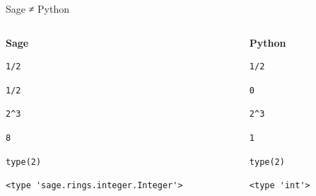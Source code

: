 \documentclass[presentation,smaller]{beamer}
\begin{document}
\begin{frame}[fragile,label={sec:orgae0d8c3}]{Sage ≠ Python}
 \begin{columns}[t]
\begin{column}{0.45\columnwidth}
\textbf{Sage}

\lstset{language=sage,label= ,caption= ,captionpos=b,numbers=none}
\begin{lstlisting}
1/2
\end{lstlisting}

\begin{verbatim}
1/2
\end{verbatim}

\lstset{language=sage,label= ,caption= ,captionpos=b,numbers=none}
\begin{lstlisting}
2^3
\end{lstlisting}

\begin{verbatim}
8
\end{verbatim}

\lstset{language=sage,label= ,caption= ,captionpos=b,numbers=none}
\begin{lstlisting}
type(2)
\end{lstlisting}

\begin{verbatim}
<type 'sage.rings.integer.Integer'>
\end{verbatim}
\end{column}

\begin{column}{0.45\columnwidth}
\textbf{Python}

\lstset{language=Python,label= ,caption= ,captionpos=b,numbers=none}
\begin{lstlisting}
1/2
\end{lstlisting}

\begin{verbatim}
0
\end{verbatim}

\lstset{language=Python,label= ,caption= ,captionpos=b,numbers=none}
\begin{lstlisting}
2^3
\end{lstlisting}

\begin{verbatim}
1
\end{verbatim}

\lstset{language=Python,label= ,caption= ,captionpos=b,numbers=none}
\begin{lstlisting}
type(2)
\end{lstlisting}

\begin{verbatim}
<type 'int'>
\end{verbatim}
\end{column}
\end{columns}
\end{frame}
\end{document}

